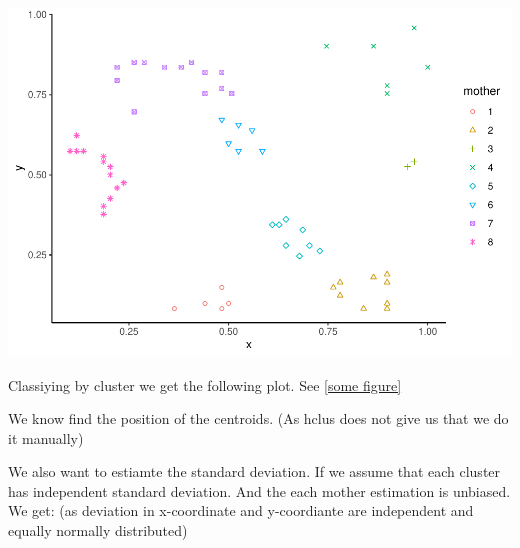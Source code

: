 \documentclass[
]{article}
\newenvironment{Shaded}{\begin{snugshade}}{\end{snugshade}}
\newcommand{\CommentTok}[1]{\textcolor[rgb]{0.56,0.35,0.01}{\textit{#1}}}
\newcommand{\DataTypeTok}[1]{\textcolor[rgb]{0.13,0.29,0.53}{#1}}
\newcommand{\KeywordTok}[1]{\textcolor[rgb]{0.13,0.29,0.53}{\textbf{#1}}}
\newcommand{\NormalTok}[1]{#1}
\newcommand{\OperatorTok}[1]{\textcolor[rgb]{0.81,0.36,0.00}{\textbf{#1}}}
\newcommand{\StringTok}[1]{\textcolor[rgb]{0.31,0.60,0.02}{#1}}
\begin{document}
\includegraphics{project2_files/figure-latex/unnamed-chunk-6-1.pdf}

Classiying by cluster we get the following plot. See \ref{some figure}

We know find the position of the centroids. (As hclus does not give us
that we do it manually)

\begin{Shaded}
\end{Shaded}

We also want to estiamte the standard deviation. If we assume that each
cluster has independent standard deviation. And the each mother
estimation is unbiased. We get: (as deviation in x-coordinate and
y-coordiante are independent and equally normally distributed)
\end{document}
